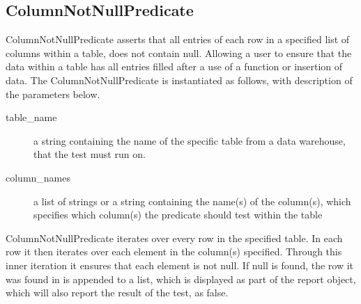 \subsection{ColumnNotNullPredicate}
ColumnNotNullPredicate asserts that all entries of each row in a specified list of columns within a table, does not contain null. Allowing a user to ensure that the data within a table has all entries filled after a use of a function or insertion of data.
The ColumnNotNullPredicate is instantiated as follows, with description of the parameters below.


\begin{description}
\item [table\_name] a string containing the name of the specific table from a data warehouse, that the test must run on. 
\item [column\_names] a list of strings or a string containing the name(s) of the column(s), which specifies which column(s) the predicate should test within the table
\end{description}

ColumnNotNullPredicate iterates over every row in the specified table. In each row it then iterates over each element in the column(s) specified. Through this inner iteration it ensures that each element is not null. If null is found, the row it was found in is appended to a list, which is displayed as part of the report object, which will also report the result of the test, as false.